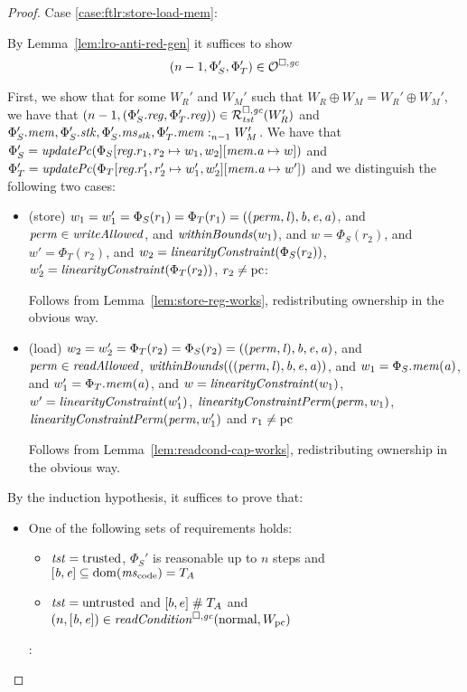 \begin{proof}
  Case \ref{case:ftlr:store-load-mem}:

  By Lemma~\ref{lem:lro-anti-red-gen} it suffices to show
  \[
    \npair[n-1]{\Phi_S',\Phi_T'} \in \lro
  \]

  First, we show that for some $W_R'$ and $W_M'$ such that $W_R \oplus W_M = W_R' \oplus W_M'$, we have that $\npair[n-1]{(\Phi_S'.\reg,\Phi_T'.\reg)} \in \lrrg{\trust}(W_R')$ and $\memSat[n-1]{\Phi_S'.\mem,\Phi_S'.\stk,\Phi_S'.\ms_\stk,\Phi_T'.\mem}{W_M'}$.
  We have that $\Phi_S' = \updPcAddr{\Phi_S\updReg{r_1,r_2}{w_1,w_2}\update{\mem.\aaddr}{w}}$ and $\Phi_T' = \updPcAddr{\Phi_T\updReg{r_1',r_2'}{w_1',w_2'}\update{\mem.\aaddr}{w'}}$ and we distinguish the following two cases:
  \begin{itemize}
  \item (store) $w_1 = w_1' = \Phi_S(r_1) = \Phi_T(r_1) =
    ((\perm,\lin),\baddr,\eaddr,\aaddr)$, and $\perm \in \writeAllowed{}$,
    and
    $\withinBounds{w_1}$, and
    $w = \Phi_S(r_2)$, and $w' = \Phi_T(r_2)$, and $w_2 = \linCons{\Phi_S(r_2)}$, $w_2' = \linCons{\Phi_T(r_2)}$,  $r_2 \neq \pcreg$:

    Follows from Lemma~\ref{lem:store-reg-works}, redistributing ownership in the obvious way.

  \item (load) $w_2 = w_2' = \Phi_T(r_2) = \Phi_S(r_2) =
    ((\perm,\lin),\baddr,\eaddr,\aaddr)$, and $\perm \in \readAllowed{}$,
    $\withinBounds{((\perm,\lin),\baddr,\eaddr,\aaddr)}$, and
    $w_1 = \Phi_S.\mem(\aaddr)$, and $w_1' = \Phi_T.\mem(\aaddr)$, and
    $w = \linCons{w_1}$, $w' = \linCons{w_1'}$, $\linConsPerm{\perm}{w_1}$, $\linConsPerm{\perm}{w_1'}$ and $r_1 \neq \pcreg$

    Follows from Lemma~\ref{lem:readcond-cap-works}, redistributing ownership in the obvious way.

  \end{itemize}

  By the induction hypothesis, it suffices to prove that:
  \begin{itemize}
  \item One of the following sets of requirements holds:
    \begin{itemize}
    \item $\trust = \trusted$, $\Phi_S'$ is reasonable up to $n$ steps and $[\baddr,\eaddr] \subseteq \dom(\mscode) = \ta$
    \item $\trust = \untrusted$ and $[b,e] \mathrel{\#} \ta$ and $\npair{[\baddr,\eaddr]} \in \readCond{\normal,W_\pcreg}$
    \end{itemize}:


\end{itemize}
\end{proof}
